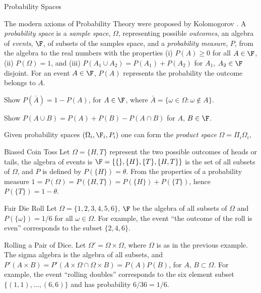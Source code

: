 \begin{section}{Probability Spaces}

The modern axioms of Probability Theory were proposed by Kolomogorov \cite{Kolmogorov:1933,Kolmogorov:1950}.
A {\em probability space} is a {\em sample space}, $\Omega$, representing possible
{\em outcomes}, an algebra of {\em events}, $\F$, of subsets of the samples space, and a {\em probability
measure}, $P$, from the algebra to the real numbers with the properties (i) $P(A)\ge0$ for
all $A\in\F$, (ii) $P(\Omega) = 1$, and (iii) $P(A_1\cup A_2) = P(A_1) + P(A_2)$ for $A_1$, $A_2\in\F$ disjoint.
For an event $A\in\F$, $P(A)$ represents the probability the
outcome belongs to $A$.

\begin{exercise}
Show $P(\bar{A}) = 1 - P(A)$, for $A\in\F$, 
where $\bar{A} = \{\omega\in\Omega\colon \omega\not\in A\}$.
\end{exercise}

\begin{exercise}
Show $P(A\cup B) = P(A) + P(B) - P(A\cap B)$ for $A$, $B\in\F$.
\end{exercise}

Given probability spaces $(\Omega_i, \F_i, P_i)$ one can form the {\em product space}
$\Omega = \Pi_i \Omega_i$, 

\begin{subsection}{Biased Coin Toss}
Let $\Omega = \{H,T\}$ represent the two possible outcomes of heads or tails, the
algebra of events is $\F = \{\{\}, \{H\}, \{T\}, \{H, T\}\}$ is the set of all
subsets of $\Omega$, and $P$ is defined by $P(\{H\}) = \theta$. From the properties
of a probability measure $1 = P(\Omega) = P(\{H,T\}) = P(\{H\}) + P(\{T\})$, hence
$P(\{T\}) = 1 - \theta$.
\end{subsection}

\begin{subsection}{Fair Die Roll}
Let $\Omega = \{1,2,3,4,5,6\}$, $\F$ be the algebra of all subsets of $\Omega$
and $P(\{\omega\}) = 1/6$ for all $\omega\in\Omega$. For example, the event
``the outcome of the roll is even'' corresponds to the subset $\{2,4,6\}$.
\end{subsection}

\begin{subsection}{Rolling a Pair of Dice.}
Let $\Omega' = \Omega\times\Omega$, where
$\Omega$ is as in the previous example. The sigma algebra is the algebra
of all subsets, and $P'(A\times B) = P'(A\times\Omega\cap\Omega\times B)
= P(A) P(B)$, for $A$, $B\subset\Omega$. For example, the event ``rolling
doubles'' corresponds to the six element subset $\{(1,1),\dots,(6,6)\}$
and has probability $6/36 = 1/6$.
\end{subsection}


\end{section}
